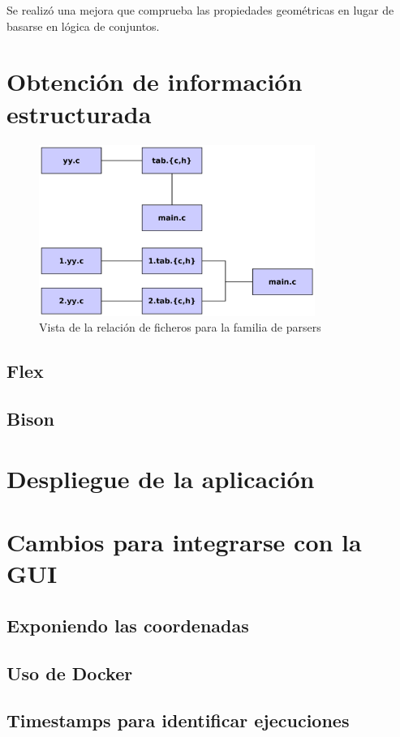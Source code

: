 Se realizó una mejora que comprueba las propiedades geométricas en lugar de basarse en lógica de conjuntos.

\section{Obtención de información estructurada}

\begin{figure}[hp!]
  \centering
  \includegraphics[width=9cm]{imaxes/estructura-parser.png}
  \caption{Vista de la relación de ficheros para la familia de parsers}
\end{figure}

\subsection{Flex}
\subsection{Bison}
\section{Despliegue de la aplicación}
\section{Cambios para integrarse con la GUI}
\subsection{Exponiendo las coordenadas}
\subsection{Uso de Docker}
\subsection{Timestamps para identificar ejecuciones}

